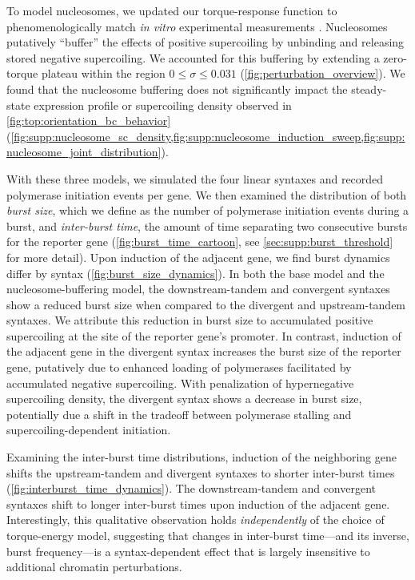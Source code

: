 \documentclass[11pt]{article} %
\begin{document}
To model nucleosomes, we updated our torque-response function to phenomenologically match \textit{in vitro} experimental measurements \parencite{leSynergisticCoordinationChromatin2019}. Nucleosomes putatively ``buffer'' the effects of positive supercoiling by unbinding and releasing stored negative supercoiling. We accounted for this buffering by extending a zero-torque plateau within the region \(0 \leq \sigma \leq 0.031\) (\cref{fig:perturbation_overview}). We found that the nucleosome buffering does not significantly impact the steady-state expression profile or supercoiling density observed in \cref{fig:top:orientation_bc_behavior} (\cref{fig:supp:nucleosome_sc_density,fig:supp:nucleosome_induction_sweep,fig:supp:nucleosome_joint_distribution}).


With these three models, we simulated the four linear syntaxes and recorded polymerase initiation events per gene. We then examined the distribution of both \emph{burst size}, which we define as the number of polymerase initiation events during a burst, and \emph{inter-burst time}, the amount of time separating two consecutive bursts for the reporter gene (\cref{fig:burst_time_cartoon}, see \cref{sec:supp:burst_threshold} for more detail). Upon induction of the adjacent gene, we find burst dynamics differ by syntax (\cref{fig:burst_size_dynamics}). In both the base model and the nucleosome-buffering model, the downstream-tandem and convergent syntaxes show a reduced burst size when compared to the divergent and upstream-tandem syntaxes. We attribute this reduction in burst size to accumulated positive supercoiling at the site of the reporter gene's promoter. In contrast, induction of the adjacent gene in the divergent syntax increases the burst size of the reporter gene, putatively due to enhanced loading of polymerases facilitated by accumulated negative supercoiling. With penalization of hypernegative supercoiling density, the divergent syntax shows a decrease in burst size, potentially due a shift in the tradeoff between polymerase stalling and supercoiling-dependent initiation. 

Examining the inter-burst time distributions, induction of the neighboring gene shifts the upstream-tandem and divergent syntaxes to shorter inter-burst times (\cref{fig:interburst_time_dynamics}).  The downstream-tandem and convergent syntaxes shift to longer inter-burst times upon induction of the adjacent gene. Interestingly, this qualitative observation holds \emph{independently} of the choice of torque-energy model, suggesting that changes in inter-burst time---and its inverse, burst frequency---is a syntax-dependent effect that is largely insensitive to additional chromatin perturbations.
\end{document}

